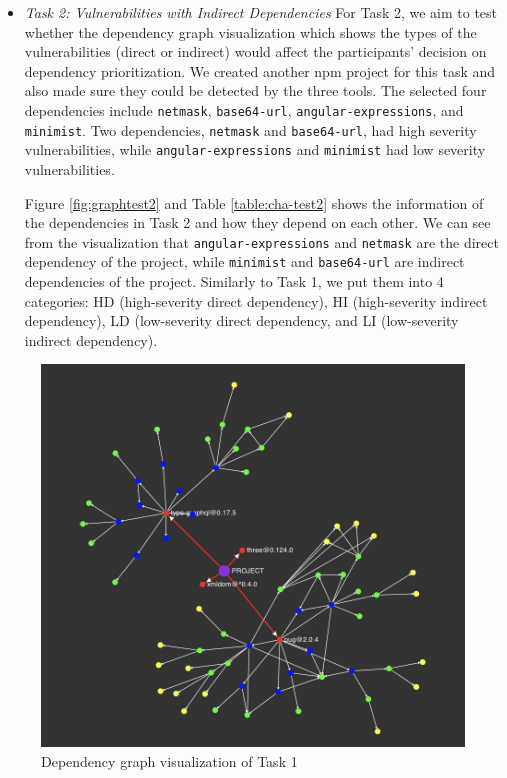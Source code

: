 \documentclass[conference]{IEEEtran}
\begin{document}
\begin{itemize}
	    \item \textit{Task 2: Vulnerabilities with Indirect Dependencies}
	    For Task 2, we aim to test whether the dependency graph visualization which shows the types of the vulnerabilities (direct or indirect) would affect the participants’ decision on dependency prioritization. We created another npm project for this task and also made sure they could be detected by the three tools. The selected four dependencies include \texttt{netmask}, \texttt{base64-url}, \texttt{angular-expressions}, and \texttt{minimist}. Two dependencies, \texttt{netmask} and \texttt{base64-url}, had high severity vulnerabilities, while \texttt{angular-expressions} and \texttt{minimist} had low severity vulnerabilities. 
	    
	    Figure \ref{fig:graphtest2} and Table \ref{table:cha-test2}  shows the information of the dependencies in Task 2 and how they depend on each other. We can see from the visualization that \texttt{angular-expressions} and \texttt{netmask} are the direct dependency of the project, while \texttt{minimist} and \texttt{base64-url} are indirect dependencies of the project.
	    Similarly to Task 1, we put them into 4 categories: HD (high-severity direct dependency), HI (high-severity indirect dependency), LD (low-severity direct dependency, and LI (low-severity indirect dependency).
	\end{itemize}

\begin{figure}[tb]
	\centering
	\includegraphics[width=0.9\columnwidth]{Figures/Achilles-Test1.jpeg}
	\caption{Dependency graph visualization of Task 1}
	\label{fig:graphtest1}
\end{figure}
\end{document}
